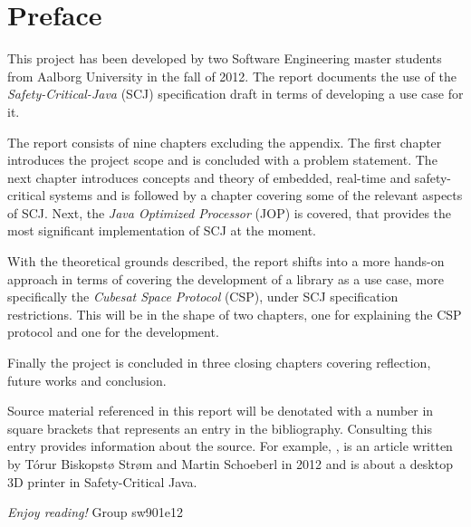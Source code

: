 \newpage
\thispagestyle{empty}
\mbox{}

\chapter*{Preface}
This project has been developed by two Software Engineering master students from Aalborg University in the fall of 2012. The report documents the use of the \textit{Safety-Critical-Java} (SCJ) specification draft in terms of developing a use case for it.

\vspace{4mm}
\noindent The report consists of nine chapters excluding the appendix. The first chapter introduces the project scope and is concluded with a problem statement. The next chapter introduces concepts and theory of embedded, real-time and safety-critical systems and is followed by a chapter covering some of the relevant aspects of SCJ. Next, the \textit{Java Optimized Processor} (JOP) is covered, that provides the most significant implementation of SCJ at the moment.

With the theoretical grounds described, the report shifts into a more hands-on approach in terms of covering the development of a library as a use case, more specifically the \textit{Cubesat Space Protocol} (CSP), under SCJ specification restrictions. This will be in the shape of two chapters, one for explaining the CSP protocol and one for the development.

Finally the project is concluded in three closing chapters covering reflection, future works and conclusion. 

\vspace{4mm}
\noindent Source material referenced in this report will be denotated with a number in square brackets that represents an entry in the bibliography. Consulting this entry provides information about the source. For example, \cite{Schoeberl:2012:RepRap}, is an article written by T\'{o}rur Biskopst{\o} Str{\o}m and Martin Schoeberl in 2012 and is about a desktop 3D printer in Safety-Critical Java.

\vspace{5mm}
	\begin{flushright}
\emph{Enjoy reading!} Group sw901e12
	\end{flushright}

\newpage
